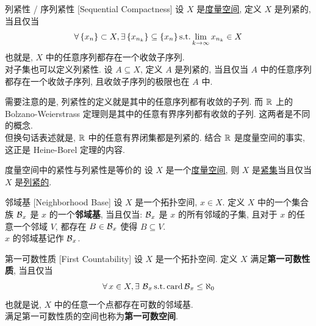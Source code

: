         \begin{vardfn}
            {列紧性 / 序列紧性}
            [Sequential Compactness]
            设 \(X\) 是\hyperref[dfn:ms]{度量空间}, 定义 \(X\) 是列紧的, 当且仅当
            \[\forall\,\{x_n\}\subset X, \exists\,\{x_{n_k}\}\subseteq\{x_n\} \operatorname{\text{s.t.}} \lim_{k \to \infty} x_{n_k} \in X\]
            也就是, \(X\) 中的任意序列都存在一个收敛子序列. \\
            对子集也可以定义列紧性. 设 \(A\subseteq X\), 定义 \(A\) 是列紧的, 当且仅当 \(A\) 中的任意序列都存在一个收敛子序列, 且收敛子序列的极限也在 \(A\) 中.
        \end{vardfn}

        \begin{rmk}
            需要注意的是, 列紧性的定义就是其中的任意序列都有收敛的子列. 而 \(\operatorname{\mathbb{R}}\) 上的 Bolzano-Weierstrass 定理则是其中的任意有界序列都有收敛的子列. 这两者是不同的概念. \\
            但换句话表述就是, \(\operatorname{\mathbb{R}}\) 中的任意有界闭集都是列紧的. 结合 \(\operatorname{\mathbb{R}}\) 是度量空间的事实, 这正是 Heine-Borel 定理的内容.
        \end{rmk}

        \begin{thm}
            {度量空间中的紧性与列紧性是等价的}
            设 \(X\) 是一个\hyperref[dfn:ms]{度量空间}, 则 \(X\) 是\hyperref[dfn:compact]{紧集}当且仅当 \(X\) 是\hyperref[dfn:sequential-compact]{列紧的}.
        \end{thm}

        \begin{vardfn}
            {邻域基}
            [Neighborhood Base]
            设 \(X\) 是一个拓扑空间, \(x\in X\). 定义 \(X\) 中的一个集合族 \(\operatorname{\mathcal{B}}_x\) 是 \(x\) 的一个\textbf{邻域基}, 当且仅当:
            \(\operatorname{\mathcal{B}}_x\) 是 \(x\) 的所有邻域的子集, 且对于 \(x\) 的任意一个邻域 \(V\), 都存在 \(B\in\operatorname{\mathcal{B}}_x\) 使得 \(B\subseteq V\).\\
            \(x\) 的邻域基记作 \(\operatorname{\mathcal{B}}_x\).
        \end{vardfn}

        \begin{vardfn}
            {第一可数性质}
            [First Countability]
            设 \(X\) 是一个拓扑空间. 定义 \(X\) 满足\textbf{第一可数性质}, 当且仅当
            \[\forall\,x\in X, \exists\,\operatorname{\mathcal{B}}_x \operatorname{\text{s.t.}} \operatorname{card} \operatorname{\mathcal{B}}_x \leq \aleph_0\]
            也就是说, \(X\) 中的任意一个点都存在可数的邻域基. \\
            满足第一可数性质的空间也称为\textbf{第一可数空间}.
        \end{vardfn}

